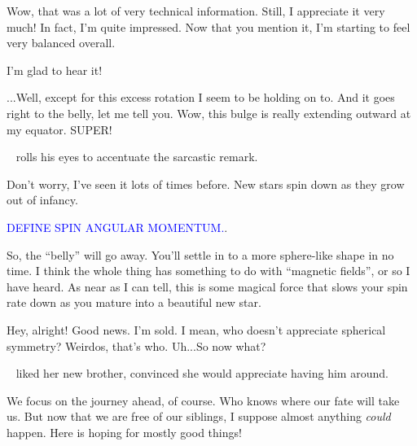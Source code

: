 \documentclass[main.tex]{subfiles}
\begin{document}
\par \Lacedaemon Wow, that was a lot of very technical information.  Still, I appreciate it very much!  In fact, I'm quite impressed.  Now that you mention it, I'm starting to feel very balanced overall.  

\par \Celaeno I'm glad to hear it!

\par \Lacedaemon ...Well, except for this excess rotation I seem to be holding on to. And it goes right to the belly, let me tell you.  Wow, this bulge is really extending outward at my equator.  SUPER!  

\par \nar \rmlacedaemon~ rolls his eyes to accentuate the sarcastic remark.

\par \Celaeno Don't worry, I've seen it lots of times before.  New stars spin down as they grow out of infancy.

\begin{tcolorbox}[sharp corners, colback=blue!30, colframe=blue!80!blue, title=Torque]
\par \textcolor{blue}{DEFINE SPIN ANGULAR MOMENTUM.}.  
\end{tcolorbox}


\par \Celaeno So, the ``belly'' will go away.  You'll settle in to a more sphere-like shape in no time.  I think the whole thing has something to do with ``magnetic fields'', or so I have heard.  As near as I can tell, this is some magical force that slows your spin rate down as you mature into a beautiful new star.

\par \Lacedaemon Hey, alright!  Good news.  I'm sold.  I mean, who doesn't appreciate spherical symmetry?  Weirdos, that's who.  Uh...So now what?

\par \nar \rmcelaeno~ liked her new brother, convinced she would appreciate having him around.

\par \Celaeno We focus on the journey ahead, of course.  Who knows where our fate will take us.  But now that we are free of our siblings, I suppose almost anything \textit{could} happen.  Here is hoping for mostly good things!
\end{document}
